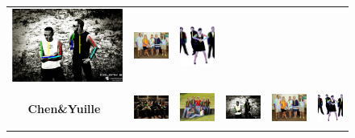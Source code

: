 \begin{figure}
\begin{tabular}{c c c c c c}
  \includegraphics[height=0.150\linewidth]{imgidx_0070_sticks_waf.pdf}&
  \includegraphics[height=0.150\linewidth]{imgidx_0167_sticks_waf.pdf}&
  \includegraphics[height=0.150\linewidth]{imgidx_0169_sticks_waf.pdf}\\
  \begin{sideways}\bf \small Chen\&Yuille~\cite{Chen:2015:POC}\end{sideways}&
  \includegraphics[height=0.150\linewidth]{imgidx_0012_sticks_chen_waf.pdf}&
  \includegraphics[height=0.150\linewidth]{imgidx_0045_sticks_chen_waf.pdf}&
  \includegraphics[height=0.150\linewidth]{imgidx_0070_sticks_chen_waf.pdf}&
  \includegraphics[height=0.150\linewidth]{imgidx_0167_sticks_chen_waf.pdf}&
  \includegraphics[height=0.150\linewidth]{imgidx_0169_sticks_chen_waf.pdf}\\


\end{tabular}
\end{figure}
